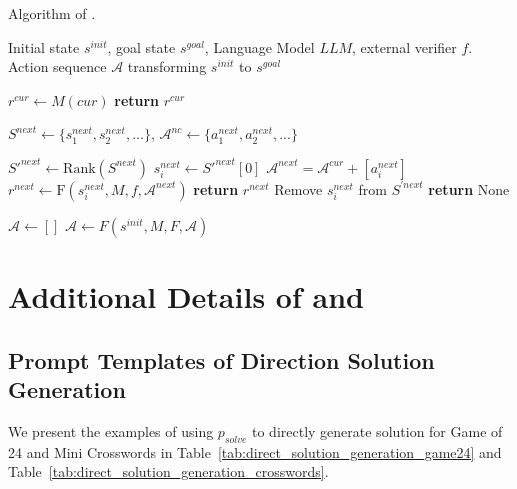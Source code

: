 \begin{algorithm}[t!] 
\caption{Algorithm of {\cmethod}.}
\label{alg:Framwork_completeness} 
\begin{algorithmic}
\REQUIRE Initial state $s^{init}$, goal state $s^{goal}$, Language Model $LLM$, external verifier $f$.
\ENSURE Action sequence $\mathcal{A}$ transforming $s^{init}$ to $s^{goal}$

    \STATE $r^{cur} \gets M(cur)$ 
        \STATE \textbf{return} $r^{cur}$ 
    \ENDIF

    \STATE $S^{next} \gets \{s^{next}_1, s^{next}_2, ...\}$, $\mathcal{A}^{nc} \gets \{a^{next}_1, a^{next}_2, ...\}$ 
    
        \STATE $S'^{next} \gets \text{Rank}(S^{next})$ 
        \STATE $s^{next}_i \gets S'^{next}[0]$ 
        \STATE $\mathcal{A}^{next} = \mathcal{A}^{cur} + [a^{next}_i]$
        \STATE $r^{next} \gets \text{F}(s^{next}_i, M, f, \mathcal{A}^{next})$
            \STATE \textbf{return} $r^{next}$
        \ENDIF        
        \STATE Remove $s^{next}_i$ from $S^{'next}$
    \ENDWHILE    
    \STATE \textbf{return} None
    
\ENDFUNCTION
\STATE $\mathcal{A} \gets []$
\STATE $\mathcal{A}\gets F(s^{init}, M, F, \mathcal{A})$
\label{algorithm}
\end{algorithmic}
\end{algorithm}

\section{Additional Details of \method and \cmethod}
\label{appendix:additional_details_seal_sealc}
\subsection{Prompt Templates of Direction Solution Generation}
\label{appendix:prompt_templates_direct_solution_generation}
We present the examples of using $p_{solve}$ to directly generate solution for Game of 24 and Mini Crosswords in Table~\ref{tab:direct_solution_generation_game24} and Table~\ref{tab:direct_solution_generation_crosswords}.

